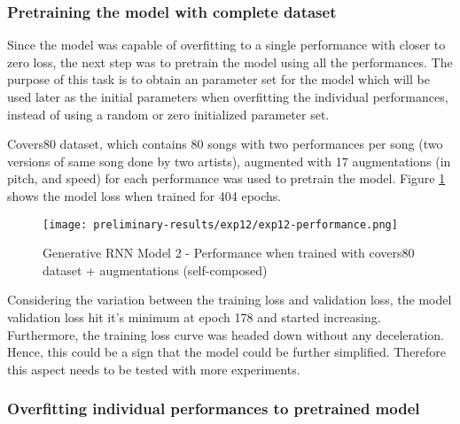 \documentclass[../main.tex]{subfiles}
\begin{document}
\iffalse
\begin{figure}[H]
    \centering
    \texttt{[image: preliminary-results/exp10/exp10-performance.png]}
    \caption{Generative RNN Model 2 - Performance}
    \label{fig:exp10-performance}
\end{figure}
\fi

\subsubsection{Pretraining the model with complete dataset}

\par
Since the model was capable of overfitting to a single performance with closer to zero loss, the next step was to pretrain the model using all the performances. The purpose of this task is to obtain an parameter set for the model which will be used later as the initial parameters when overfitting the individual performances, instead of using a random or zero initialized parameter set.

\par
Covers80 dataset, which contains 80 songs with two performances per song (two versions of same song done by two artists), augmented with 17 augmentations (in pitch, and speed) for each performance was used to pretrain the model. Figure \ref{fig:exp12-performance} shows the model loss when trained for 404 epochs. 

\begin{figure}[H]
    \centering
    \texttt{[image: preliminary-results/exp12/exp12-performance.png]}
    \caption{Generative RNN Model 2 - Performance when trained with covers80 dataset + augmentations (self-composed)}
    \label{fig:exp12-performance}
\end{figure}

\par
Considering the variation between the training loss and validation loss, the model validation loss hit it's minimum at epoch 178 and started increasing. Furthermore, the training loss curve was headed down without any deceleration. Hence, this could be a sign that the model could be further simplified. Therefore this aspect needs to be tested with more experiments.



\subsubsection{Overfitting individual performances to pretrained model}
\end{document}
